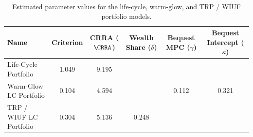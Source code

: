 \begin{table}\centering
    \begin{tabular}{lccccc}
        \toprule
        Name                   & Criterion & CRRA ($\CRRA $) & Wealth Share ($\delta $) & Bequest MPC ($ \gamma $) & Bequest Intercept ($ \kappa $) \\
        \midrule
        Life-Cycle Portfolio   & 1.049     & 9.195          &                         &                           &                                 \\
        Warm-Glow LC Portfolio & 0.104     & 4.594          &                         & 0.112                     & 0.321                          \\
        TRP / WIUF LC Portfolio       & 0.304     & 5.136          & 0.248                   &                           &                                 \\
        \bottomrule
    \end{tabular}
    \caption{Estimated parameter values for the life-cycle, warm-glow, and TRP / WIUF portfolio models.}
    \label{parameters}
\end{table}